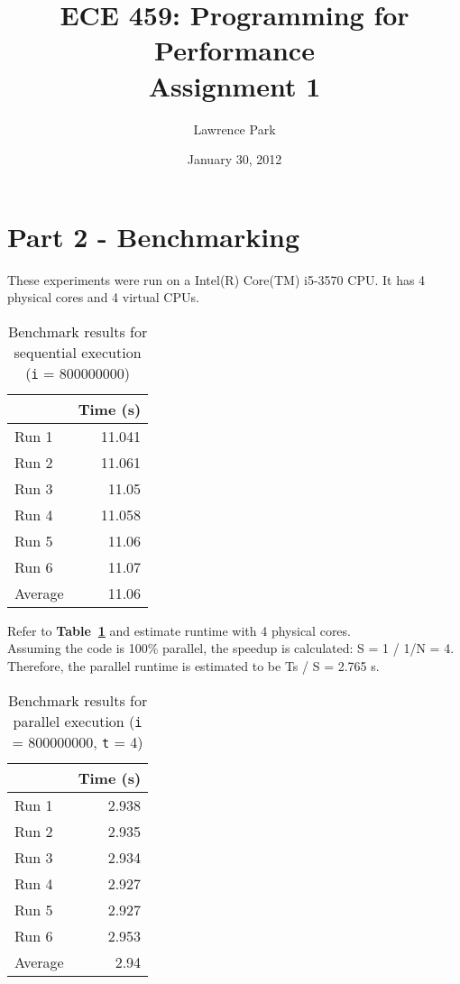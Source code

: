 \documentclass[12pt]{article}
\title{ECE 459: Programming for Performance\\Assignment 1}
\author{Lawrence Park}
\date{January 30, 2012}
\newcommand{\iterations}{800000000}
\newcommand{\physicalcores}{4}
\newcommand{\virtualcpus}{4}
\begin{document}
\maketitle

\section*{Part 2 - Benchmarking}

These experiments were run on a Intel(R) Core(TM) i5-3570 CPU. It has \physicalcores{} physical cores and \virtualcpus{} virtual
CPUs.

\begin{table}[H]
  \centering
  \begin{tabular}{lr}
    & {\bf Time (s)} \\
    \hline
    Run 1 & 11.041 \\
    Run 2 & 11.061 \\
    Run 3 & 11.05 \\
    Run 4 & 11.058 \\
    Run 5 & 11.06 \\
    Run 6 & 11.07\\
    \hline
    Average & 11.06 \\
  \end{tabular}
  \caption{Benchmark results for sequential execution ({\tt i} = \iterations{})}
  \label{tbl_sequential}
\end{table}

Refer to {\bf Table~\ref{tbl_sequential}} and estimate runtime with
\physicalcores{} physical cores.
\\
\indent
Assuming the code is 100\% parallel, the speedup is calculated: S = 1 / 1/N = 4.
Therefore, the parallel runtime is estimated to be Ts / S = 2.765 s.

\begin{table}[H]
  \centering
  \begin{tabular}{lr}
    & {\bf Time (s)} \\
    \hline
    Run 1 & 2.938 \\
    Run 2 & 2.935 \\
    Run 3 & 2.934 \\
    Run 4 & 2.927 \\
    Run 5 & 2.927 \\
    Run 6 & 2.953 \\
    \hline
    Average & 2.94 \\
  \end{tabular}
  \caption{Benchmark results for parallel execution ({\tt i} = \iterations{},
    {\tt t} = \physicalcores{})}
  \label{tbl_parallel_physicalcores}
\end{table}
\end{document}
